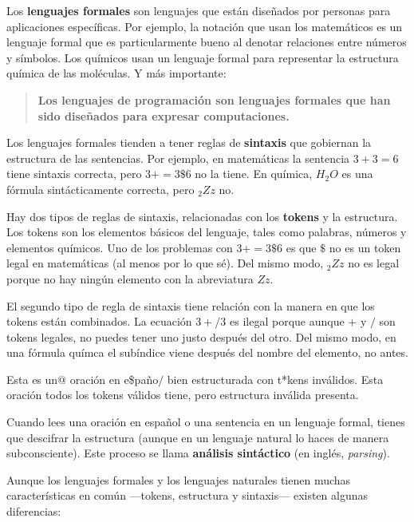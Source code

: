 \documentclass[10pt]{book}
\begin{document}
Los {\bf lenguajes formales} son lenguajes que están diseñados por personas
para aplicaciones específicas.  Por ejemplo, la notación que usan los
matemáticos es un lenguaje formal que es particularmente bueno al denotar
relaciones entre números y símbolos.  Los químicos usan un lenguaje formal
para representar la estructura química de las moléculas.  Y
más importante:

\begin{quote}
{\bf Los lenguajes de programación son lenguajes formales que han sido
diseñados para expresar computaciones.}
\end{quote}

Los lenguajes formales tienden a tener reglas de {\bf sintaxis} que
gobiernan la estructura de las sentencias.
Por ejemplo, en matemáticas la sentencia
$3 + 3 = 6$ tiene sintaxis correcta, pero
$3 + = 3 \$ 6$ no la tiene.  En química,
$H_2O$ es una fórmula sintácticamente correcta, pero $_2Zz$ no.

Hay dos tipos de reglas de sintaxis, relacionadas con los {\bf tokens} y la
estructura.  Los tokens son los elementos básicos del lenguaje, tales como
palabras, números y elementos químicos.  Uno de los problemas con
$3 += 3 \$ 6$ es que \( \$ \) no es un token legal en matemáticas
(al menos por lo que sé).  Del mismo modo, $_2Zz$ no es legal porque
no hay ningún elemento con la abreviatura $Zz$.

El segundo tipo de regla de sintaxis tiene relación con la manera en que los
tokens están combinados.  La ecuación $3 +/ 3$ es ilegal porque aunque $+$
y $/$ son tokens legales, no puedes tener uno justo después del otro.
Del mismo modo, en una fórmula químca el subíndice viene después del nombre
del elemento, no antes.

Esta es un@ oración en e\$paño$/$ bien estructurada
con t*kens inválidos.  Esta oración todos los tokens válidos
tiene, pero estructura inválida presenta.

Cuando lees una oración en español o una sentencia en un lenguaje
formal, tienes que descifrar la estructura
(aunque en un lenguaje natural lo haces de manera subconsciente).  Este
proceso se llama {\bf análisis sintáctico} (en inglés, {\em parsing}).

Aunque los lenguajes formales y los lenguajes naturales tienen muchas características en
común ---tokens, estructura y sintaxis--- existen algunas
diferencias:
\end{document}

